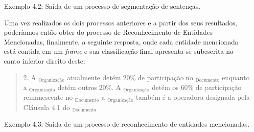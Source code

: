 \documentclass[11pt]{report}
\begin{document}
\begin{quote}
\end{quote}

\begin{quote}
\end{quote}

\begin{quote}
\end{quote}

\begin{center}
  Exemplo 4.2: Saída de um processo de segmentação de sentenças.
\end{center}

Uma vez realizados os dois processos anteriores e a partir dos seus resultados, poderíamos então obter do processo de Reconhecimento de Entidades Mencionadas,
finalmente, a seguinte resposta, onde cada entidade mencionada está contida em um \textit{frame} e sua classificação final apresenta-se subescrita no canto inferior direito deste:

\begin{quote}
  \begin{varwidth}{0.95\textwidth}
  2. A $_{\text{Organização}}$ atualmente detém 20\% de participação no $_{\text{Documento}}$ enquanto a $_{\text{Organização}}$
  detém outros 20\%. A $_{\text{Organização}}$ detém os 60\% de participação remanescente no $_{\text{Documento}}$ a
  $_{\text{Organização}}$ também é a operadora designada pela Cláusula 4.1 do $_{\text{Documento}}$
  \end{varwidth}
\end{quote}
\begin{center}
  Exemplo 4.3: Saída de um processo de reconhecimento de entidades mencionadas.
\end{center}
\end{document}
